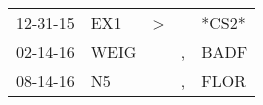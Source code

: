 \begin{supertabular}{p{0.07\textwidth}p{0.06\textwidth}p{0.02\textwidth}p{0.02\textwidth}p{0.06\textwidth}}
 12-31-15\textsuperscript{} &   EX1\textsuperscript{} &  \textgreater &    &                   *CS2* \\
 02-14-16\textsuperscript{} &  WEIG\textsuperscript{} &               &  , &  BADF\textsuperscript{} \\
 08-14-16\textsuperscript{} &    N5\textsuperscript{} &               &  , &  FLOR\textsuperscript{} \\
\end{supertabular}

